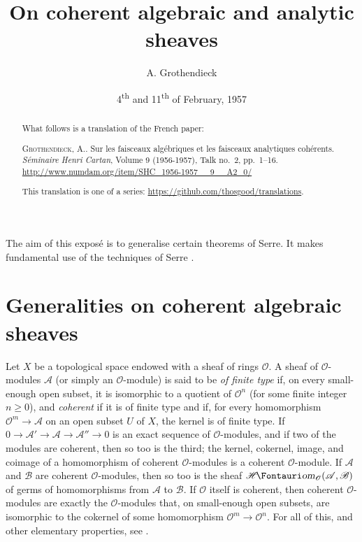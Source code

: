\documentclass[11pt]{article}
\theoremstyle{plain}
\theoremstyle{definition}
\newcommand{\sh}{\mathscr}
\newcommand{\shHom}{\sh{H}\textup{\kern-2.2pt{\Fontauri\slshape om}}}
\renewcommand{\geq}{\geqslant}
\newcommand{\oldpage}[1]{\marginpar{\textit{p.~#1}}}
\begin{document}
\renewcommand{\abstractname}{Translator's note.}

\title{On coherent algebraic and analytic sheaves}
\author{A. Grothendieck}
\date{4\textsuperscript{th} and 11\textsuperscript{th} of February, 1957}
\maketitle

\begin{abstract}
  What follows is a translation of the French paper:

  \smallskip\noindent
  \textsc{Grothendieck, A.}. Sur les faisceaux algébriques et les faisceaux analytiques cohérents. \emph{Séminaire Henri Cartan}, Volume 9 (1956-1957), Talk no.~2, pp.~1–16. {\footnotesize\url{http://www.numdam.org/item/SHC_1956-1957__9__A2_0/}}

  \smallskip
  This translation is one of a series: {\footnotesize\url{https://github.com/thosgood/translations}.}
\end{abstract}

\tableofcontents



\bigskip
The aim of this exposé is to generalise certain theorems of Serre.
\oldpage{2-01}
It makes fundamental use of the techniques of Serre \cite{1,2,3}.


\section{Generalities on coherent algebraic sheaves}

Let $X$ be a topological space endowed with a sheaf of rings $\sh{O}$.
A sheaf of $\sh{O}$-modules $\sh{A}$ (or simply an $\sh{O}$-module) is said to be \emph{of finite type} if, on every small-enough open subset, it is isomorphic to a quotient of $\sh{O}^n$ (for some finite integer $n\geq0$), and \emph{coherent} if it is of finite type and if, for every homomorphism $\sh{O}^m\to\sh{A}$ on an open subset $U$ of $X$, the kernel is of finite type.
If $0\to\sh{A}'\to\sh{A}\to\sh{A}''\to0$ is an exact sequence of $\sh{O}$-modules, and if two of the modules are coherent, then so too is the third;
the kernel, cokernel, image, and coimage of a homomorphism of coherent $\sh{O}$-modules is a coherent $\sh{O}$-module.
If $\sh{A}$ and $\sh{B}$ are coherent $\sh{O}$-modules, then so too is the sheaf $\shHom_\sh{O}(\sh{A},\sh{B})$ of germs of homomorphisms from $\sh{A}$ to $\sh{B}$.
If $\sh{O}$ itself is coherent, then coherent $\sh{O}$-modules are exactly the $\sh{O}$-modules that, on small-enough open subsets, are isomorphic to the cokernel of some homomorphism $\sh{O}^m\to\sh{O}^n$.
For all of this, and other elementary properties, see \cite[chapitre~1, paragraphe~2]{1}.
\end{document}
